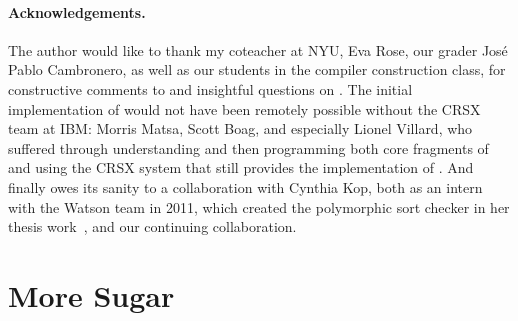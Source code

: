 \documentclass[letterpaper,11pt]{article}
\begin{document}
\paragraph*{Acknowledgements.} The author would like to thank my coteacher at NYU, Eva Rose, our
grader José Pablo Cambronero, as well as our students in the compiler construction class, for
constructive comments to and insightful questions on \HAX.
The initial implementation of \HAX would not have been remotely possible without the CRSX team at
IBM: Morris Matsa, Scott Boag, and especially Lionel Villard, who suffered through understanding and
then programming both core fragments of and using the CRSX system that still provides the
implementation of \HAX.
And finally \HAX owes its sanity to a collaboration with Cynthia Kop, both as an intern with the
Watson team in 2011, which created the polymorphic sort checker in her thesis work~\cite{Kop:2012},
and our continuing collaboration.






\appendix
\section{More Sugar}
\end{document}
